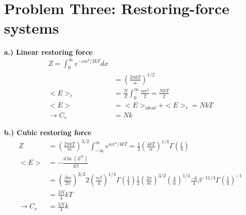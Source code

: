 \documentclass[10pt]{article} %
\begin{document}
\section{Problem Three: Restoring-force systems}

\textbf{a.) Linear restoring force}
\begin{align*}
  Z = \int_0^\infty e^{-\alpha x^2/2kT}dx\\
  &= \left(\frac{2\pi kT}{\alpha}\right)^{1/2}\\
  <E>_r &= \frac{N}{Z}\int_0^\infty \frac{\alpha x^2}{2}
  = \frac{NkT}{2}\\
  <E> &= <E>_{ideal} + <E>_r = NkT\\
 \rightarrow C_v &= Nk
\end{align*}

\textbf{b.) Cubic restoring force}
\begin{align*}
  Z &= \left(\frac{2\pi kT}{m}\right)^{3/2}\int_{-\infty}^{\infty}e^{\alpha x^4/4kT}
  = \frac{1}{2}\left(\frac{4kT}{\alpha}\right)^{1/4}\Gamma\left(\frac{1}{4}\right)\\
  <E> &= -\frac{d\ln(Z^N)}{d\beta}\\
  &= \left(\frac{\beta m}{2\pi}\right)^{3/2}2\left(\frac{\alpha\beta}{4}\right)^{1/4}
  \Gamma\left(\frac{1}{4}\right)\frac{1}{2}\left(\frac{2\pi}{m}\right)^{3/2}
  \left(\frac{4}{\alpha}\right)^{1/4}\frac{-6}{4}\beta^{-11/4}\Gamma\left(\frac{1}{4}\right)^{-1}\\
  &= \frac{3N}{4}kT\\
  \rightarrow C_v &= \frac{3N}{4}k
\end{align*}
\end{document}
